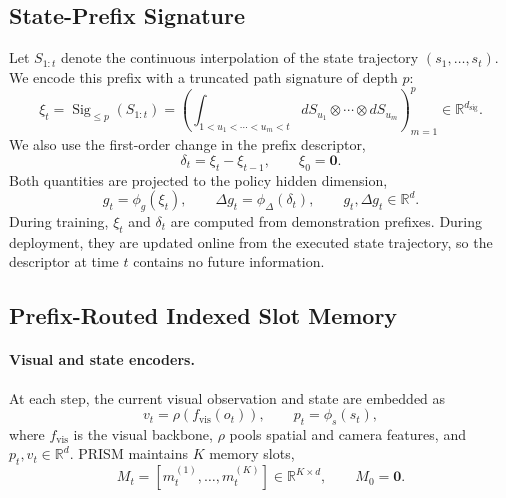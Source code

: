 \subsection{State-Prefix Signature}
\label{sec:method_signature}

Let $S_{1:t}$ denote the continuous interpolation of the state trajectory
$(s_1,\ldots,s_t)$. We encode this prefix with a truncated path signature of
depth $p$:
\begin{equation}
    \xi_t =
    \operatorname{Sig}_{\leq p}(S_{1:t})
    =
    \left(
    \int_{1<u_1<\cdots<u_m<t}
    dS_{u_1}\otimes\cdots\otimes dS_{u_m}
    \right)_{m=1}^{p}
    \in \mathbb{R}^{d_{\mathrm{sig}}}.
    \label{eq:path_signature}
\end{equation}
We also use the first-order change in the prefix descriptor,
\begin{equation}
    \delta_t = \xi_t - \xi_{t-1}, \qquad \xi_0=\mathbf{0}.
    \label{eq:delta_signature}
\end{equation}
Both quantities are projected to the policy hidden dimension,
\begin{equation}
    g_t = \phi_g(\xi_t), \qquad
    \Delta g_t = \phi_{\Delta}(\delta_t),
    \qquad g_t,\Delta g_t \in \mathbb{R}^d.
    \label{eq:signature_projection}
\end{equation}
During training, $\xi_t$ and $\delta_t$ are computed from demonstration prefixes.
During deployment, they are updated online from the executed state trajectory, so
the descriptor at time $t$ contains no future information.

\subsection{Prefix-Routed Indexed Slot Memory}
\label{sec:method_prism_memory}

\paragraph{Visual and state encoders.}
At each step, the current visual observation and state are embedded as
\begin{equation}
    v_t = \rho\!\left(f_{\mathrm{vis}}(o_t)\right), \qquad
    p_t = \phi_s(s_t),
    \label{eq:vis_state_embed}
\end{equation}
where $f_{\mathrm{vis}}$ is the visual backbone, $\rho$ pools spatial and camera
features, and $p_t,v_t \in \mathbb{R}^d$. PRISM maintains $K$ memory slots,
\begin{equation}
    M_t =
    [m_t^{(1)},\ldots,m_t^{(K)}] \in \mathbb{R}^{K \times d},
    \qquad M_0=\mathbf{0}.
\end{equation}

